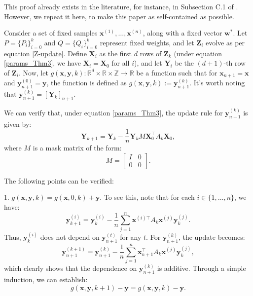 \documentclass[11pt]{article}
\theoremstyle{plain}
\theoremstyle{definition}
\theoremstyle{remark}
\numberwithin{equation}{section}
\begin{document}
This proof already exists in the literature, for instance, in Subsection C.1 of \cite{ahn2024transformers}. However, we repeat it here, to make this paper as self-contained as possible.

Consider a set of fixed samples \( \mathbf{x}^{(1)}, \dots, \mathbf{x}^{(n)} \), along with a fixed vector \( \mathbf{w}^* \). Let \( P = \{P_i\}_{i=0}^{k} \) and \( Q = \{Q_i\}_{i=0}^{k} \) represent fixed weights, and let \( \mathbf{Z}_i \) evolve as per equation \eqref{Z-update}. Define \( \mathbf{X}_i \) as the first \( d \) rows of \( \mathbf{Z}_k \) (under equation \eqref{params_Thm3}, we have \( \mathbf{X}_i = \mathbf{X}_0 \) for all \( i \)), and let \( \mathbf{Y}_i \) be the \( (d+1) \)-th row of \( \mathbf{Z}_i \). Now, let \( g(\mathbf{x}, \mathbf{y}, k) : \mathbb{R}^d \times \mathbb{R} \times \mathbb{Z} \to \mathbb{R} \) be a function such that for \( \mathbf{x}_{n+1} = \mathbf{x} \) and \( \mathbf{y}_{n+1}^{(0)} = \mathbf{y} \), the function is defined as \( g(\mathbf{x}, \mathbf{y}, k) := \mathbf{y}_{n+1}^{(k)} \). It’s worth noting that \( \mathbf{y}_{n+1}^{(k)} = [\mathbf{Y}_k]_{n+1} \).

We can verify that, under equation \eqref{params_Thm3}, the update rule for \( \mathbf{y}_{n+1}^{(k)} \) is given by:
\begin{equation}
\mathbf{Y}_{k+1} = \mathbf{Y}_k - \frac{1}{n} \mathbf{Y}_k M \mathbf{X}_0^\top A_k \mathbf{X}_0,
\label{Yk_update}
\end{equation}
where \( M \) is a mask matrix of the form:
\[
M = \begin{bmatrix} I & 0 \\ 0 & 0 \end{bmatrix}.
\]

The following points can be verified:

1. \( g(\mathbf{x}, \mathbf{y}, k) = g(\mathbf{x}, 0, k) + \mathbf{y} \). To see this, note that for each \( i \in \{1, \dots, n\} \), we have:
\[
\mathbf{y}^{(i)}_{k+1} = \mathbf{y}^{(i)}_k - \frac{1}{n} \sum_{j=1}^{n} \mathbf{x}^{(i)\top} A_k \mathbf{x}^{(j)} \mathbf{y}^{(j)}_k.
\]
Thus, \( \mathbf{y}^{(i)}_k \) does not depend on \( \mathbf{y}_{n+1}^{(t)} \) for any \( t \). For \( \mathbf{y}_{n+1}^{(k)} \), the update becomes:
\[
\mathbf{y}_{n+1}^{(k+1)} = \mathbf{y}_{n+1}^{(k)} - \frac{1}{n} \sum_{j=1}^{n} \mathbf{x}_{n+1}^\top A_k \mathbf{x}^{(j)} \mathbf{y}^{(j)}_k,
\]
which clearly shows that the dependence on \( \mathbf{y}_{n+1}^{(k)} \) is additive. Through a simple induction, we can establish:
\[
g(\mathbf{x}, \mathbf{y}, k+1) - \mathbf{y} = g(\mathbf{x}, \mathbf{y}, k) - \mathbf{y}.
\]
\end{document}
